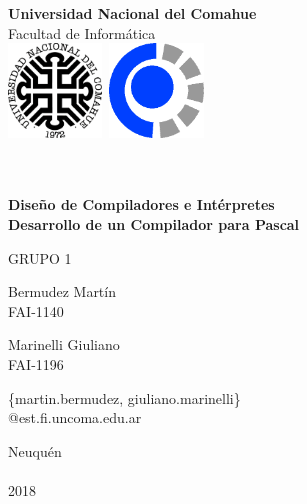 \titlepage

\begin{center}
	
	\vspace{-0.5cm}
	
	{\Large{\bf \sc Universidad Nacional del Comahue}}\\
	
	{\Large { \sc Facultad de Informática}}\\
	
	\vspace{-2.5cm}
	\mbox{\includegraphics[width=2.5cm,height=2.5cm]{img/unc.png}\hspace{12cm} \includegraphics[width=2.5cm,height=2.5cm]{img/fai.png}}
	
	
	\vspace{2cm}
	
	\ \\
	\ \\
	{\Large {\bf Diseño de Compiladores e Intérpretes}} \\ 
	\vspace{1cm}
	{\LARGE {\bf Desarrollo de un Compilador para Pascal}}\\
	\vspace{3cm}
	
    {\Large GRUPO 1}\\
    \vspace{1cm}
	
	{\Large Bermudez Martín}\\
    \vspace{0.5cm}
    {\Large FAI-1140}
	\vspace{1cm}
	
	{\Large Marinelli Giuliano}\\
    \vspace{0.5cm}
    {\Large FAI-1196}
	\vspace{5cm}
	
	{\Large \{martin.bermudez, giuliano.marinelli\}\\
    @est.fi.uncoma.edu.ar}\\
	\vspace{1cm}
    
	\vfill
	{\Large {\sc Neuqu\'en}\hspace{6cm}{\sc Argentina}}\\
	\ \\
	
	{\Large 2018}\\
	
\end{center}

\pagebreak